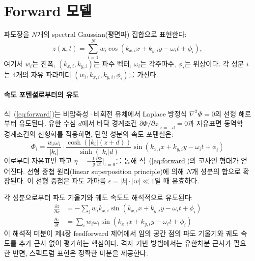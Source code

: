 \documentclass[11pt]{report}
\numberwithin{equation}{chapter}
\numberwithin{figure}{chapter}
\numberwithin{table}{chapter}
\begin{document}
\section{Forward 모델}
\label{sec:forward}

파도장을 $N$개의 spectral Gaussian(평면파) 집합으로 표현한다:
\begin{equation}
  z(\mathbf{x}, t) = \sum_{i=1}^{N}
    w_i \cos\!\left(k_{x,i} x + k_{y,i} y - \omega_i t + \phi_i\right),
  \label{eq:forward}
\end{equation}
여기서 $w_i$는 진폭, $(k_{x,i}, k_{y,i})$는 파수 벡터,
$\omega_i$는 각주파수, $\phi_i$는 위상이다.
각 성분 $i$는 4개의 자유 파라미터 $(w_i, k_{x,i}, k_{y,i}, \phi_i)$를 가진다.

\paragraph{속도 포텐셜로부터의 유도}
식~(\ref{eq:forward})는 비압축성·비회전 유체에서 Laplace 방정식
$\nabla^2 \Phi = 0$의 선형 해로부터 유도된다.
유한 수심 $d$에서 바닥 경계조건 $\partial\Phi/\partial z|_{z=-d} = 0$과
자유표면 동역학 경계조건의 선형화를 적용하면,
단일 성분의 속도 포텐셜은:
\begin{equation}
  \Phi_i = \frac{w_i \omega_i}{|k_i|} \cdot
    \frac{\cosh(|k_i|(z+d))}{\sinh(|k_i|d)}
    \sin(k_{x,i}x + k_{y,i}y - \omega_i t + \phi_i)
  \label{eq:potential}
\end{equation}
이로부터 자유표면 파고 $\eta = -\frac{1}{g}\frac{\partial\Phi}{\partial t}\big|_{z=0}$를
통해 식~(\ref{eq:forward})의 코사인 형태가 얻어진다.
선형 중첩 원리(linear superposition principle)에 의해 $N$개 성분의 합으로 확장된다.
이 선형 중첩은 파도 가파름 $\epsilon = |k|\cdot|w| \ll 1$일 때 유효하다.

각 성분으로부터 파도 기울기와 궤도 속도도 해석적으로 유도된다:
\begin{align}
  \frac{\partial z}{\partial x} &= -\sum_{i} w_i k_{x,i} \sin(k_{x,i}x + k_{y,i}y - \omega_i t + \phi_i)
  \label{eq:slope_x} \\
  \frac{\partial z}{\partial t} &= \sum_{i} w_i \omega_i \sin(k_{x,i}x + k_{y,i}y - \omega_i t + \phi_i)
  \label{eq:orbital}
\end{align}
이 해석적 미분이 제4장 feedforward 제어에서 임의 공간 점의
파도 기울기와 궤도 속도를 추가 근사 없이 평가하는 핵심이다.
격자 기반 방법에서는 유한차분 근사가 필요한 반면,
스펙트럼 표현은 정확한 미분을 제공한다.
\end{document}

